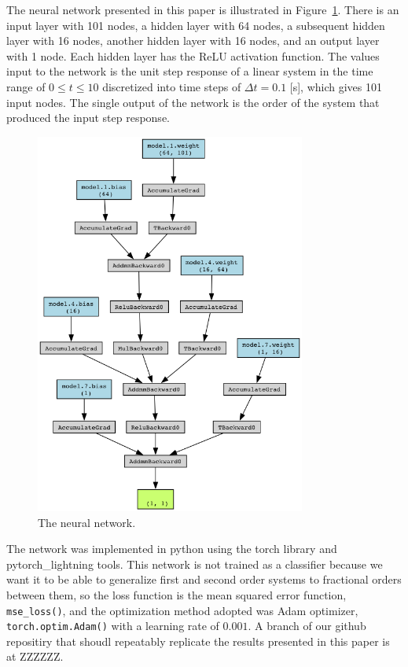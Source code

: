 \documentclass[letterpaper, 10 pt, conference]{ieeeconf}  %
\begin{document}
  The neural network presented in this paper is illustrated in
  Figure~\ref{fig:thennet}. There is an input layer with 101 nodes, a hidden
  layer with 64 nodes, a subsequent hidden layer with 16 nodes, another hidden
  layer with 16 nodes, and an output layer with 1 node. Each hidden layer has
  the ReLU activation function. The values input to the network is the unit step
  response of a linear system in the time range of $0 \leq t \leq 10$
  discretized into time steps of $\Delta t = 0.1$ [s], which gives 101 input
  nodes. The single output of the network is the order of the system that
  produced the input step response. 

  \begin{figure}
  \centering
  \includegraphics[width=3.5in]{viz.png}
  \caption{The neural network.}
  \label{fig:thennet}
  \end{figure}

  The network was implemented in python using the torch library and
  pytorch\_lightning tools. This network is not trained as a classifier because
  we want it to be able to generalize first and second order systems to
  fractional orders between them, so the loss function is the mean squared error
  function, \texttt{mse\_loss()}, and the optimization method adopted was Adam
  optimizer, \texttt{torch.optim.Adam()} with a learning rate of $0.001$. A
  branch of our github repositiry that shoudl repeatably replicate the results
  presented in this paper is at ZZZZZZ.
\end{document}
